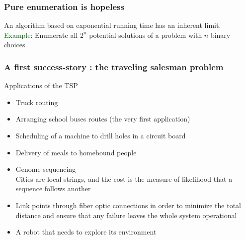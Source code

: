 \documentclass[9pt,handout]{beamer}
\begin{document}
\begin{frame}
\frametitle{Pure enumeration is hopeless}
An algorithm based on \alert{exponential running time} has an inherent limit.\\
\textcolor{darkgreen}{Example}: Enumerate all $2^n$ potential solutions of a problem
with $n$ \alert{binary choices}.
\end{frame}
\begin{frame}
\frametitle{A first success-story : the traveling salesman problem}
\begin{block}{Applications of the TSP}
\begin{itemize}
\item<1-> Truck routing
\item<1-> Arranging school buses routes  (the very first application)
\item<1-> Scheduling of a machine to drill holes in a circuit board
\item<1-> Delivery of meals to homebound people
\item<1-> Genome sequencing\\
Cities are local strings, and the cost is the measure of likelihood that
a sequence follows another
\item<1-> Link points through fiber optic connections  in order to
minimize the total distance and ensure that any failure leaves
the whole system operational
\item<1-> A robot that needs to explore its environment
\end{itemize}
\end{block}
\end{frame}
\end{document}
